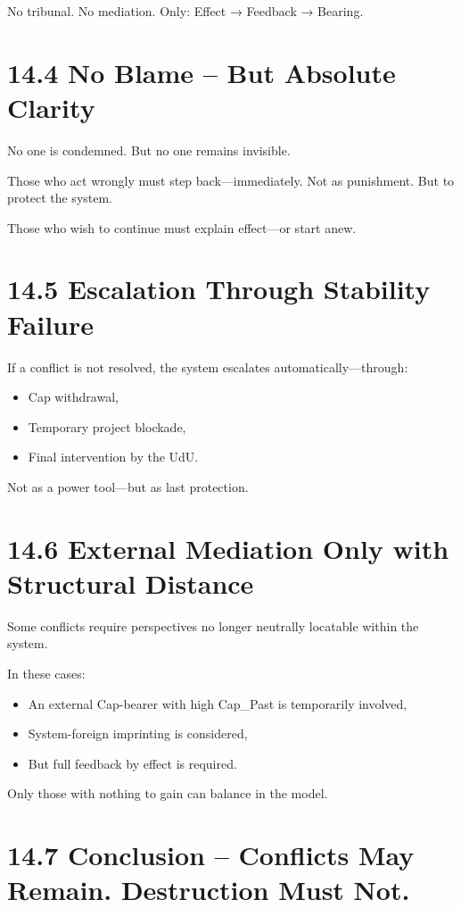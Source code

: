 \documentclass[12pt,a4paper]{book}
\begin{document}
No tribunal.  
No mediation.  
Only: Effect → Feedback → Bearing.

\section*{14.4 No Blame – But Absolute Clarity}

No one is condemned.  
But no one remains invisible.

Those who act wrongly must step back—immediately.  
Not as punishment.  
But to protect the system.

Those who wish to continue must explain effect—or start anew.

\section*{14.5 Escalation Through Stability Failure}

If a conflict is not resolved,  
the system escalates automatically—through:

\begin{itemize}
    \item Cap withdrawal,
    \item Temporary project blockade,
    \item Final intervention by the UdU.
\end{itemize}

Not as a power tool—but as last protection.

\section*{14.6 External Mediation Only with Structural Distance}

Some conflicts require perspectives  
no longer neutrally locatable within the system.

In these cases:

\begin{itemize}
    \item An external Cap-bearer with high Cap\_Past is temporarily involved,
    \item System-foreign imprinting is considered,
    \item But full feedback by effect is required.
\end{itemize}

Only those with nothing to gain  
can balance in the model.

\section*{14.7 Conclusion – Conflicts May Remain. Destruction Must Not.}
\end{document}
